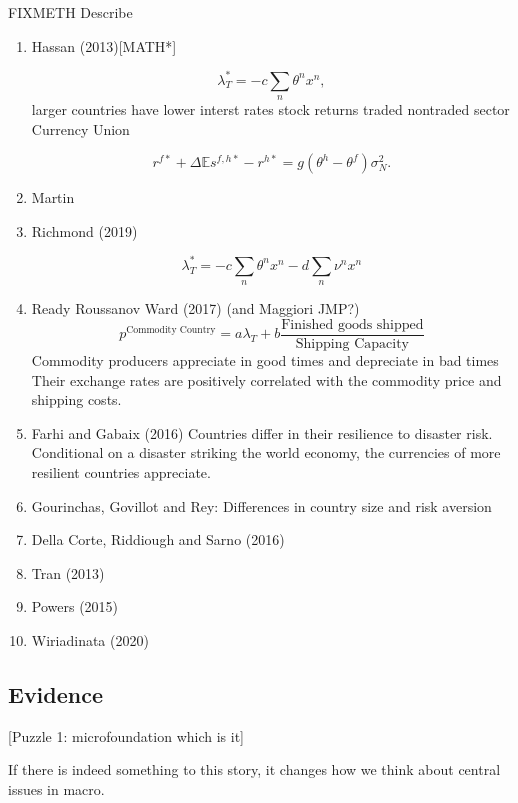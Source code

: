 \documentclass{ar-1col}
\begin{document}
FIXMETH Describe
\begin{enumerate}
\item Hassan (2013)[MATH*]

\begin{equation} \lambda_{T}^\ast = -c
  \sum_{n} \theta^n x^n,
  \label{eqn:lambdat2NP}
\end{equation}
larger countries have lower interst rates
stock returns traded nontraded sector
Currency Union

\begin{equation}
  r^{f \ast} + \Delta \mathbb{E} s^{f, h \ast} - r^{h \ast}
  =g\left(\theta^h - \theta^f\right) \sigma_N^2.
  \label{eq_FF_UIP}
\end{equation}
\item Martin
\item Richmond (2019)

$$\lambda_{T}^\ast = -c
  \sum_{n} \theta^n x^n- d\sum_{n} \nu^n x^n$$



\item Ready Roussanov Ward (2017) (and Maggiori JMP?)
$$p^{\text{Commodity Country}}=a\lambda_T+b\frac{\text{Finished goods shipped}}{\text{Shipping Capacity}} $$
Commodity producers appreciate in good times and depreciate in bad times
Their exchange rates are positively correlated with the commodity price and shipping costs.
\item Farhi and Gabaix (2016)
Countries differ in their resilience to disaster risk. Conditional on a disaster striking the world economy, the currencies of more resilient countries appreciate. 
\item Gourinchas, Govillot and Rey: Differences in country size and risk aversion
\item Della Corte, Riddiough and Sarno (2016)
\item Tran (2013)
\item Powers (2015)
\item Wiriadinata (2020)
\end{enumerate}

\subsection{Evidence}

[Puzzle 1: microfoundation which is it]

If there is indeed something to this story, it changes how we think
about central issues in macro.
\end{document}
